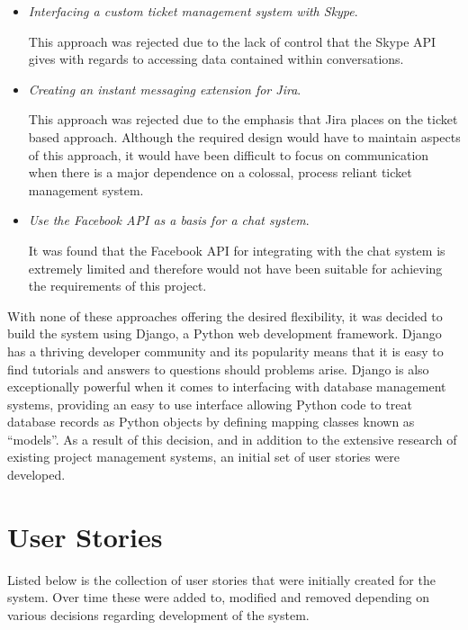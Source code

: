 \documentclass[a4paper]{l3proj}
\begin{document}
\begin{itemize}
\item \textit{Interfacing a custom ticket management system with Skype}. \par This approach was rejected due to the lack of control that the Skype API gives with regards to accessing data contained within conversations.
\item \textit{Creating an instant messaging extension for Jira}. \par This approach was rejected due to the emphasis that Jira places on the ticket based approach. Although the required design would have to maintain aspects of this approach, it would have been difficult to focus on communication when there is a major dependence on a colossal, process reliant ticket management system.
\item \textit{Use the Facebook API as a basis for a chat system}. \par  It was found that the Facebook API for integrating with the chat system is extremely limited and therefore would not have been suitable for achieving the requirements of this project.

\end{itemize}

With none of these approaches offering the desired flexibility, it was decided to build the system using Django, a Python web development framework. Django has a thriving developer community and its popularity means that it is easy to find tutorials and answers to questions should problems arise. Django is also exceptionally powerful when it comes to interfacing with database management systems, providing an easy to use interface allowing Python code to treat database records as Python objects by defining mapping classes known as “models”. As a result of this decision, and in addition to the extensive research of existing project management systems, an initial set of user stories were developed.

\section{User Stories}
\label{userStories}

Listed below is the collection of user stories that were initially created for the system.  Over time these were added to, modified and removed depending on various decisions regarding development of the system.
\end{document}
